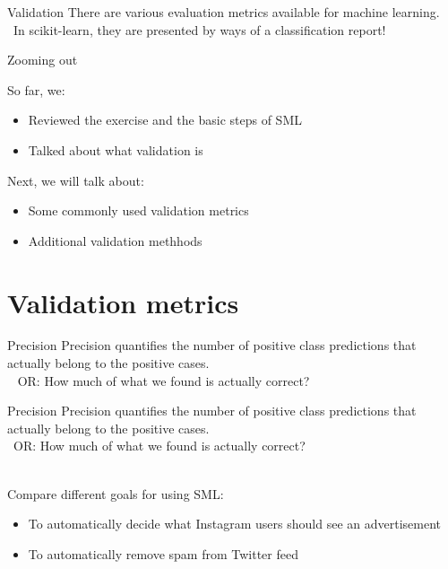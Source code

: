 \documentclass[compress]{beamer}
\begin{document}
\begin{frame}[fragile]{Validation}
There are various evaluation metrics available for machine learning. \\\
In scikit-learn, they are presented by ways of a classification report!
\end{frame}


\begin{frame}[fragile]{Zooming out} 
	
\begin{alertblock}{So far, we:}
\begin{itemize}
	\item Reviewed the exercise and the basic steps of SML
	\item Talked about what validation is
\end{itemize}
\end{alertblock}
	
\begin{alertblock}{Next, we will talk about:}
\begin{itemize}
	\item Some commonly used validation metrics
	\item Additional validation methhods
\end{itemize}
\end{alertblock}	
\end{frame}

\section{Validation metrics}

\begin{frame}[fragile]{Precision}
Precision quantifies the number of positive class predictions that actually belong to the positive cases. \\\ 
\pause
OR: How much of what we found is actually correct?
\end{frame}

\begin{frame}{Precision}
Precision quantifies the number of positive class predictions that actually belong to the positive cases. \\\ 
OR: How much of what we found is actually correct? \\\


\begin{alertblock}{Compare different goals for using SML:}
\begin{itemize}
	\item To automatically decide what Instagram users should see an advertisement
	\item To automatically remove spam from Twitter feed
\end{itemize}
\end{alertblock}
\end{frame}
\end{document}
